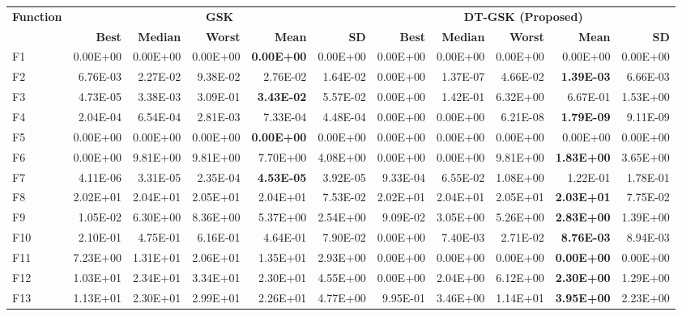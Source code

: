 \zebra
\begin{tabular}{lrrrrrrrrrr}
\toprule
\textbf{Function} & \multicolumn{5}{c}{\textbf{GSK}} & \multicolumn{5}{c}{\textbf{DT-GSK (Proposed)}} \\
\cmidrule(lr){2-6} \cmidrule(lr){7-11}
 & \textbf{Best} & \textbf{Median} & \textbf{Worst} & \textbf{Mean} & \textbf{SD} & \textbf{Best} & \textbf{Median} & \textbf{Worst} & \textbf{Mean} & \textbf{SD} \\
\midrule
F1 & 0.00E+00 & 0.00E+00 & 0.00E+00 & \textbf{0.00E+00} & 0.00E+00 & 0.00E+00 & 0.00E+00 & 0.00E+00 & 0.00E+00 & 0.00E+00 \\
F2 & 6.76E-03 & 2.27E-02 & 9.38E-02 & 2.76E-02 & 1.64E-02 & 0.00E+00 & 1.37E-07 & 4.66E-02 & \textbf{1.39E-03} & 6.66E-03 \\
F3 & 4.73E-05 & 3.38E-03 & 3.09E-01 & \textbf{3.43E-02} & 5.57E-02 & 0.00E+00 & 1.42E-01 & 6.32E+00 & 6.67E-01 & 1.53E+00 \\
F4 & 2.04E-04 & 6.54E-04 & 2.81E-03 & 7.33E-04 & 4.48E-04 & 0.00E+00 & 0.00E+00 & 6.21E-08 & \textbf{1.79E-09} & 9.11E-09 \\
F5 & 0.00E+00 & 0.00E+00 & 0.00E+00 & \textbf{0.00E+00} & 0.00E+00 & 0.00E+00 & 0.00E+00 & 0.00E+00 & 0.00E+00 & 0.00E+00 \\
F6 & 0.00E+00 & 9.81E+00 & 9.81E+00 & 7.70E+00 & 4.08E+00 & 0.00E+00 & 0.00E+00 & 9.81E+00 & \textbf{1.83E+00} & 3.65E+00 \\
F7 & 4.11E-06 & 3.31E-05 & 2.35E-04 & \textbf{4.53E-05} & 3.92E-05 & 9.33E-04 & 6.55E-02 & 1.08E+00 & 1.22E-01 & 1.78E-01 \\
F8 & 2.02E+01 & 2.04E+01 & 2.05E+01 & 2.04E+01 & 7.53E-02 & 2.02E+01 & 2.04E+01 & 2.05E+01 & \textbf{2.03E+01} & 7.75E-02 \\
F9 & 1.05E-02 & 6.30E+00 & 8.36E+00 & 5.37E+00 & 2.54E+00 & 9.09E-02 & 3.05E+00 & 5.26E+00 & \textbf{2.83E+00} & 1.39E+00 \\
F10 & 2.10E-01 & 4.75E-01 & 6.16E-01 & 4.64E-01 & 7.90E-02 & 0.00E+00 & 7.40E-03 & 2.71E-02 & \textbf{8.76E-03} & 8.94E-03 \\
F11 & 7.23E+00 & 1.31E+01 & 2.06E+01 & 1.35E+01 & 2.93E+00 & 0.00E+00 & 0.00E+00 & 0.00E+00 & \textbf{0.00E+00} & 0.00E+00 \\
F12 & 1.03E+01 & 2.34E+01 & 3.34E+01 & 2.30E+01 & 4.55E+00 & 0.00E+00 & 2.04E+00 & 6.12E+00 & \textbf{2.30E+00} & 1.29E+00 \\
F13 & 1.13E+01 & 2.30E+01 & 2.99E+01 & 2.26E+01 & 4.77E+00 & 9.95E-01 & 3.46E+00 & 1.14E+01 & \textbf{3.95E+00} & 2.23E+00 \\

\end{tabular}
